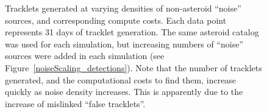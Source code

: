\begin{figure}[ht!]
\caption[Tracklet generation for runs with noise.]{Tracklets generated at varying densities of non-asteroid
  ``noise'' sources, and corresponding compute costs.  Each data point
  represents 31 days of tracklet generation.  The same asteroid
  catalog was used for each simulation, but increasing numbers of
  ``noise'' sources were added in each simulation (see
  Figure~\ref{noiseScaling_detections}). Note that the number of
  tracklets generated, and the computational costs to find them,
  increase quickly as noise density increases. This is apparently due
  to the increase of mislinked ``false tracklets''. }
\label{noiseScaling_tracklets}
\end{figure}


\begin{figure}[ht!]
\centering

\\

\end{figure}
